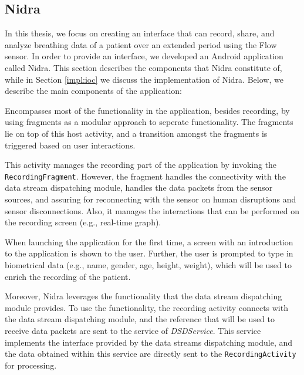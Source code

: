 \subsection{Nidra}
In this thesis, we focus on creating an interface that can record, share, and analyze breathing data of a patient over an extended period using the Flow sensor. In order to provide an interface, we developed an Android application called Nidra. This section describes the components that Nidra constitute of, while in Section \ref{impl:ioc} we discuss the implementation of Nidra. Below, we describe the main components of the application:
 
\begin{description}[font=\normalfont\itshape]
    \item[MainActivity:] Encompasses most of the functionality in the application, besides recording, by using fragments as a modular approach to seperate functionality. The fragments lie on top of this host activity, and a transition amongst the fragments is triggered based on user interactions. 
    \item[RecordingActivity:] This activity manages the recording part of the application by invoking the \verb|RecordingFragment|. However, the fragment handles the connectivity with the data stream dispatching module, handles the data packets from the sensor sources, and assuring for reconnecting with the sensor on human disruptions and sensor disconnections. Also, it manages the interactions that can be performed on the recording screen (e.g., real-time graph).
    \item[LandingActivity:] When launching the application for the first time, a screen with an introduction to the application is shown to the user. Further, the user is prompted to type in biometrical data (e.g., name, gender, age, height, weight), which will be used to enrich the recording of the patient. 
\end{description}

Moreover, Nidra leverages the functionality that the data stream dispatching module provides. To use the functionality, the recording activity connects with the data stream dispatching module, and the reference that will be used to receive data packets are sent to the service of \textit{DSDService}. This service implements the interface provided by the data streams dispatching module, and the data obtained within this service are directly sent to the \verb|RecordingActivity| for processing. 


